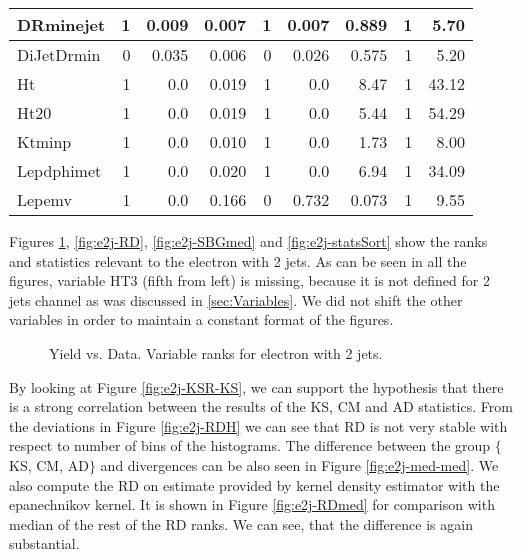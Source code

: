 \begin{table}[htbp]
\begin{center}
\begin{tabular}{|l|r|r|r|r|r|r|r|r|}
\textsf{DRminejet} & 1 & 0.009 & 0.007 & 1 & 0.007 & 0.889 & 1 & 5.70 \\ \hline
\textsf{DiJetDrmin} & 0 & 0.035 & 0.006 & 0 & 0.026 & 0.575 & 1 & 5.20 \\ \hline
\textsf{Ht} & 1 & 0.0 & 0.019 & 1 & 0.0 & 8.47 & 1 & 43.12 \\ \hline
\textsf{Ht20} & 1 & 0.0 & 0.019 & 1 & 0.0 & 5.44 & 1 & 54.29 \\ \hline
\textsf{Ktminp} & 1 & 0.0 & 0.010 & 1 & 0.0 & 1.73 & 1 & 8.00 \\ \hline
\textsf{Lepdphimet} & 1 & 0.0 & 0.020 & 1 & 0.0 & 6.94 & 1 & 34.09 \\ \hline
\textsf{Lepemv} & 1 & 0.0 & 0.166 & 0 & 0.732 & 0.073 & 1 & 9.55 \\ \hline
\end{tabular}
\end{center}
\label{tab:e2j-tests}
\end{table}


Figures \ref{fig:e2j-KSR}, \ref{fig:e2j-RD},  \ref{fig:e2j-SBGmed} and \ref{fig:e2j-statsSort} show the ranks and statistics relevant to the electron with 2 jets. As can be seen in all the figures, variable HT3 (fifth from left) is missing, because it is not defined for 2 jets channel as was discussed in \ref{sec:Variables}. We did not shift the other variables in order to maintain a constant format of the figures. 

\begin{figure}[htb]
    \centering
	\quad
    \caption{Yield vs. Data. Variable ranks for electron with 2 jets.}
     \label{fig:e2j-KSR}
\end{figure}	

By looking at Figure \ref{fig:e2j-KSR-KS}, we can support the hypothesis that there is a strong correlation between the results of the KS, CM and AD statistics. From the deviations in Figure \ref{fig:e2j-RDH} we can see that RD is not very stable with respect to number of bins of the histograms. The difference between the group $\lbrace$KS, CM, AD$\rbrace$ and \ren divergences can be also seen in Figure \ref{fig:e2j-med-med}. We also compute the RD on estimate provided by kernel density estimator with the epanechnikov kernel. It is shown in Figure \ref{fig:e2j-RDmed} for comparison with median of the rest of the RD ranks. We can see, that the difference is again substantial. 

